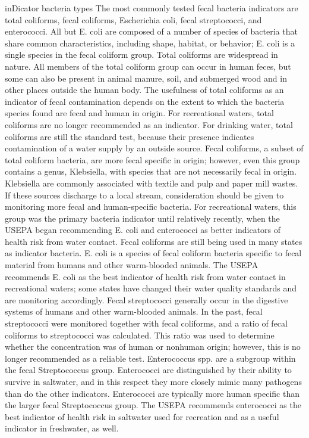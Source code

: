 \documentclass{article}
\begin{document}
inDicator bacteria types The most commonly tested fecal bacteria
indicators are total coliforms, fecal coliforms, Escherichia coli, fecal
streptococci, and enterococci. All but E. coli are composed of a number
of species of bacteria that share common characteristics, including
shape, habitat, or behavior; E. coli is a single species in the fecal
coliform group. Total coliforms are widespread in nature. All members of
the total coliform group can occur in human feces, but some can also be
present in animal manure, soil, and submerged wood and in other places
outside the human body. The usefulness of total coliforms as an
indicator of fecal contamination depends on the extent to which the
bacteria species found are fecal and human in origin. For recreational
waters, total coliforms are no longer recommended as an indicator. For
drinking water, total coliforms are still the standard test, because
their presence indicates contamination of a water supply by an outside
source. Fecal coliforms, a subset of total coliform bacteria, are more
fecal specific in origin; however, even this group contains a genus,
Klebsiella, with species that are not necessarily fecal in origin.
Klebsiella are commonly associated with textile and pulp and paper mill
wastes. If these sources discharge to a local stream, consideration
should be given to monitoring more fecal and human-specific bacteria.
For recreational waters, this group was the primary bacteria indicator
until relatively recently, when the USEPA began recommending E. coli and
enterococci as better indicators of health risk from water contact.
Fecal coliforms are still being used in many states as indicator
bacteria. E. coli is a species of fecal coliform bacteria specific to
fecal material from humans and other warm-blooded animals. The USEPA
recommends E. coli as the best indicator of health risk from water
contact in recreational waters; some states have changed their water
quality standards and are monitoring accordingly. Fecal streptococci
generally occur in the digestive systems of humans and other
warm-blooded animals. In the past, fecal streptococci were monitored
together with fecal coliforms, and a ratio of fecal coliforms to
streptococci was calculated. This ratio was used to determine whether
the concentration was of human or nonhuman origin; however, this is no
longer recommended as a reliable test. Enterococcus spp. are a subgroup
within the fecal Streptococcus group. Enterococci are distinguished by
their ability to survive in saltwater, and in this respect they more
closely mimic many pathogens than do the other indicators. Enterococci
are typically more human specific than the larger fecal Streptococcus
group. The USEPA recommends enterococci as the best indicator of health
risk in saltwater used for recreation and as a useful indicator in
freshwater, as well.
\end{document}
